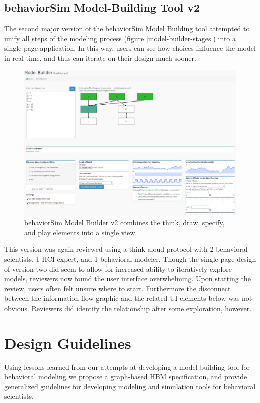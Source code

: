 \documentclass[conference]{IEEEtran}
\begin{document}
\subsection{behaviorSim Model-Building Tool v2}
The second major version of the behaviorSim Model Building tool attempted to unify all steps of the modeling process (figure \ref{model-builder-stages}) into a single-page application.
In this way, users can see how choices influence the model in real-time, and thus can iterate on their design much sooner.

\begin{figure}[!t]
  \centering
  \includegraphics[width=0.9\columnwidth]{img/v2}  
  \caption{behaviorSim Model Builder v2 combines the think, draw, specify, and play elements into a single view.}
  \label{model-builder-v2}
\end{figure}

This version was again reviewed using a think-aloud protocol with 2 behavioral scientists, 1 HCI expert, and 1 behavioral modeler.
Though the single-page design of version two did seem to allow for increased ability to iteratively explore models, reviewers now found the user interface overwhelming.
Upon starting the review, users often felt unsure where to start.
Furthermore the disconnect between the information flow graphic and the related UI elements below was not obvious.
Reviewers did identify the relationship after some exploration, however. 

  


  
\section{Design Guidelines}
Using lessons learned from our attempts at developing a model-building tool for behavioral modeling we propose a graph-based HBM specification, and provide generalized guidelines for developing modeling and simulation tools for behavioral scientists.
\end{document}
